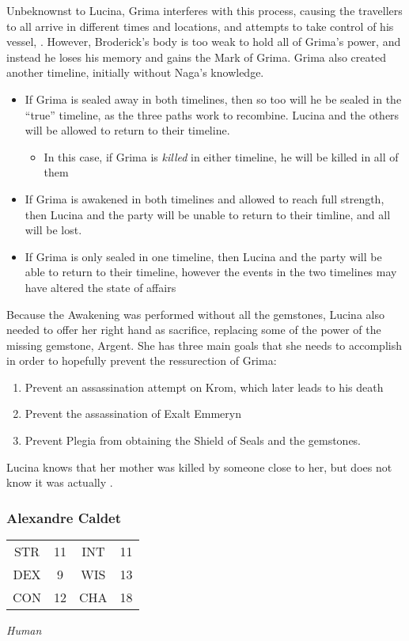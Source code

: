 Unbeknownst to Lucina, Grima interferes with this process, causing the travellers to all arrive in different times and locations, and attempts to take control of his vessel, . However, Broderick's body is too weak to hold all of Grima's power, and instead he loses his memory and gains the Mark of Grima. Grima also created another timeline, initially without Naga's knowledge. 
\begin{itemize}
\item If Grima is sealed away in both timelines, then so too will he be sealed in the ``true'' timeline, as the three paths work to recombine. Lucina and the others will be allowed to return to their timeline.
\begin{itemize}
\item In this case, if Grima is \textit{killed} in either timeline, he will be killed in all of them
\end{itemize}
\item If Grima is awakened in both timelines and allowed to reach full strength, then Lucina and the party will be unable to return to their timline, and all will be lost.
\item If Grima is only sealed in one timeline, then Lucina and the party will be able to return to their timeline, however the events in the two timelines may have altered the state of affairs
\end{itemize}

Because the Awakening was performed without all the gemstones, Lucina also needed to offer her right hand as sacrifice, replacing some of the power of the missing gemstone, Argent. She has three main goals that she needs to accomplish in order to hopefully prevent the ressurection of Grima:
\begin{enumerate}
\item Prevent an assassination attempt on Krom, which later leads to his death
\item Prevent the assassination of Exalt Emmeryn
\item Prevent Plegia from obtaining the Shield of Seals and the gemstones.
\end{enumerate}

Lucina knows that her mother was killed by someone close to her, but does not know it was actually .

\subsubsection{Alexandre Caldet}
\label{people:alcalde}
\begin{center}
\begin{tabular}{c c|c c}
STR & 11 & INT & 11\\
DEX & 9 & WIS & 13 \\
CON & 12 & CHA & 18 \end{tabular}\end{center}
\textit{Human}\\

